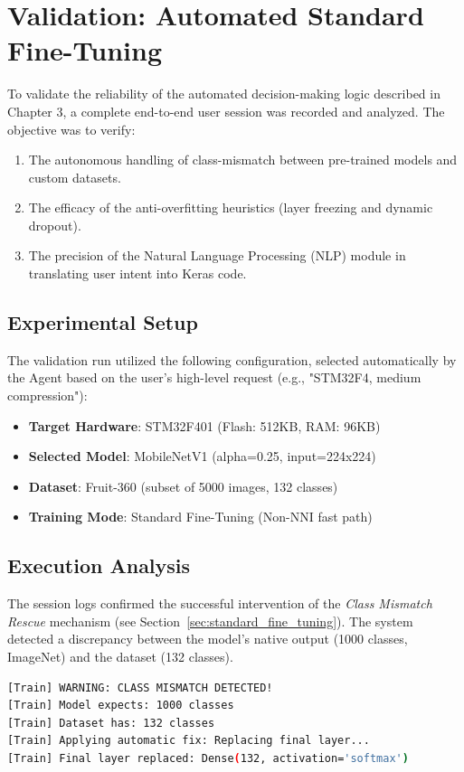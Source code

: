 \section{Validation: Automated Standard Fine-Tuning}
\label{sec:auto_finetuning_results}

To validate the reliability of the automated decision-making logic described in Chapter 3, a complete end-to-end user session was recorded and analyzed. The objective was to verify:
\begin{enumerate}
    \item The autonomous handling of class-mismatch between pre-trained models and custom datasets.
    \item The efficacy of the anti-overfitting heuristics (layer freezing and dynamic dropout).
    \item The precision of the Natural Language Processing (NLP) module in translating user intent into Keras code.
\end{enumerate}

\subsection{Experimental Setup}
The validation run utilized the following configuration, selected automatically by the Agent based on the user's high-level request (e.g., "STM32F4, medium compression"):

\begin{itemize}
    \item \textbf{Target Hardware}: STM32F401 (Flash: 512KB, RAM: 96KB)
    \item \textbf{Selected Model}: MobileNetV1 (alpha=0.25, input=224x224)
    \item \textbf{Dataset}: Fruit-360 (subset of 5000 images, 132 classes)
    \item \textbf{Training Mode}: Standard Fine-Tuning (Non-NNI fast path)
\end{itemize}

\subsection{Execution Analysis}
The session logs confirmed the successful intervention of the \textit{Class Mismatch Rescue} mechanism (see Section~\ref{sec:standard_fine_tuning}). The system detected a discrepancy between the model's native output (1000 classes, ImageNet) and the dataset (132 classes).

\begin{lstlisting}[language=bash, caption={Log excerpt showing autonomous architecture repair}, label={lst:log_repair}]
[Train] WARNING: CLASS MISMATCH DETECTED!
[Train] Model expects: 1000 classes
[Train] Dataset has: 132 classes
[Train] Applying automatic fix: Replacing final layer...
[Train] Final layer replaced: Dense(132, activation='softmax')
\end{lstlisting}

